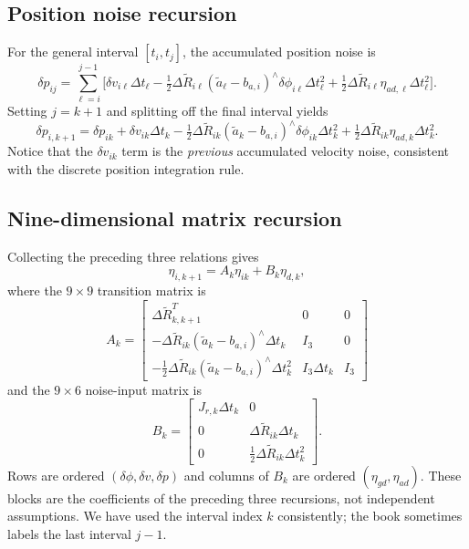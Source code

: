 \documentclass[11pt,a4paper]{article}
\begin{document}
\subsection{Position noise recursion}
For the general interval $[t_i,t_j]$, the accumulated position noise is
\begin{equation}
\delta p_{ij}=\sum_{\ell=i}^{j-1}\bigl[\delta v_{i\ell}\Delta t_\ell-\tfrac12\Delta\tilde R_{i\ell}(\tilde a_\ell-b_{a,i})^\wedge\delta\phi_{i\ell}\Delta t_\ell^2+\tfrac12\Delta\tilde R_{i\ell}\eta_{ad,\ell}\Delta t_\ell^2\bigr].
\end{equation}
Setting $j=k+1$ and splitting off the final interval yields
\begin{equation}
\delta p_{i,k+1}=\delta p_{ik}+\delta v_{ik}\Delta t_k-\tfrac12\Delta\tilde R_{ik}(\tilde a_k-b_{a,i})^\wedge\delta\phi_{ik}\Delta t_k^2+\tfrac12\Delta\tilde R_{ik}\eta_{ad,k}\Delta t_k^2.
\end{equation}
Notice that the $\delta v_{ik}$ term is the \emph{previous} accumulated
velocity noise, consistent with the discrete position integration rule.

\subsection{Nine-dimensional matrix recursion}
Collecting the preceding three relations gives
\begin{equation}\label{eq:noise_recursion}
\boxed{\eta_{i,k+1}=A_k\eta_{ik}+B_k\eta_{d,k}},
\end{equation}
where the $9\times9$ transition matrix is
\begin{equation}\label{eq:A_noise}
\boxed{
A_k=\begin{bmatrix}
\Delta\tilde R_{k,k+1}^T&0&0\\
-\Delta\tilde R_{ik} (\tilde a_k-b_{a,i})^\wedge \Delta t_k&I_3&0\\
-\tfrac12 \Delta\tilde R_{ik} (\tilde a_k-b_{a,i})^\wedge \Delta t_k^2&I_3\Delta t_k&I_3
\end{bmatrix}}
\end{equation}
and the $9\times6$ noise-input matrix is
\begin{equation}\label{eq:B_noise}
\boxed{
B_k=\begin{bmatrix}
J_{r,k}\Delta t_k&0\\
0&\Delta\tilde R_{ik}\Delta t_k\\
0&\tfrac12 \Delta\tilde R_{ik}\Delta t_k^2
\end{bmatrix}.}
\end{equation}
Rows are ordered $(\delta\phi,\delta v,\delta p)$ and columns of
$B_k$ are ordered $(\eta_{gd},\eta_{ad})$. These blocks are the
coefficients of the preceding three recursions, not independent
assumptions. We have used the interval index $k$ consistently; the
book sometimes labels the last interval $j-1$.
\end{document}
